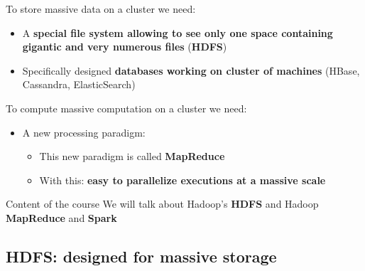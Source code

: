 \documentclass{beamer}[10pt, usepdftitle=false handout]
\begin{document}
	\begin{frame}	
To store massive data on a cluster we need:
\vspace*{0.6em}

\begin{itemize}
	\item{A \textbf{special file system allowing to see only one space containing gigantic and very numerous files} (\textbf{HDFS})}
	\item{Specifically designed \textbf{databases working on cluster of machines} (HBase, Cassandra, ElasticSearch)}
\end{itemize}

To compute massive computation on a cluster we need:
\vspace*{0.6em}

\begin{itemize}
\item{A new processing paradigm:
	\begin{itemize}
		\item{This new paradigm is called \textbf{MapReduce}}
		\item{With this: \textbf{easy to parallelize executions at a massive scale}}		
	\end{itemize}}
\end{itemize}

\begin{block}{Content of the course}
We will talk about Hadoop's \textbf{HDFS} and Hadoop \textbf{MapReduce} and \textbf{Spark}	
\end{block}	
			
	\end{frame}		
	
\subsection{HDFS: designed for massive storage}	
	
\end{document}
